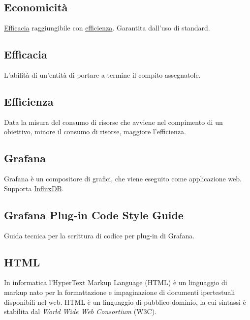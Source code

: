 	\newpage


	\subsection{Economicità}
	\label{sec:economicita}
	\underline{\hyperref[sec:efficacia]{Efficacia}} raggiungibile con \underline{\hyperref[sec:efficienza]{efficienza}}. Garantita dall'uso di standard.

	\subsection{Efficacia}
	\label{sec:efficacia}
	L'abilità di un'entità di portare a termine il compito assegnatole.


	\subsection{Efficienza}
	\label{sec:efficienza}
	Data la misura del consumo di risorse che avviene nel compimento di un obiettivo, minore il consumo di risorse, maggiore l'efficienza.
	
	
	\newpage
	
	\subsection{Grafana}
	\label{sec:grafana}
	Grafana è un compositore di grafici, che viene eseguito come applicazione web. Supporta \underline{\hyperref[sec:influxdb]{InfluxDB}}.


	\subsection{Grafana Plug-in Code Style Guide}
	\label{sec:grafana}
	Guida tecnica per la scrittura di codice per plug-in di Grafana.	
	

	\newpage 


	\subsection{HTML}
	\label{sec:html}
	In informatica l'HyperText Markup Language (HTML) è un linguaggio di markup  nato per la formattazione e impaginazione di documenti ipertestuali disponibili nel web. HTML è un linguaggio di pubblico dominio, la cui sintassi è stabilita dal \emph{World Wide Web Consortium} (W3C).
	

